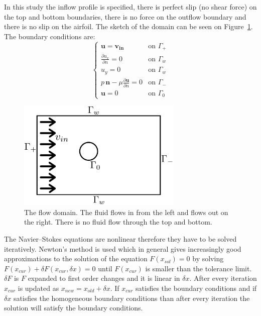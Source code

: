 \documentclass[12pt, a4paper]{article}
\begin{document}
    In this study the inflow profile is specified, there is perfect slip (no shear force) on the top and bottom boundaries, there is no force on the outflow boundary and there is no slip on the airfoil. The sketch of the domain can be seen on Figure~\ref{flow_domain}. The boundary conditions are:
    \begin{equation} \label{flow_boundary_conditions}
    \begin{cases}
    \mathbf{u} = \mathbf{v_{in}} & \text{on } \Gamma_+ \\
    \frac{\partial u_x}{\partial n} = 0 & \text{on } \Gamma_w \\
    u_y = 0  & \text{on } \Gamma_w \\
    p \, \mathbf{n} - \mu \frac{\partial \mathbf{u}}{\partial n} = 0 & \text{on } \Gamma_- \\
    \mathbf{u} = 0 & \text{on } \Gamma_0
    \end{cases}
    \end{equation}
    \begin{figure}[htbp]
        \centering
        \includegraphics[width=0.7\textwidth]{domain_vector_2}
        \caption{The flow domain. The fluid flows in from the left and flows out on the right. There is no fluid flow through the top and bottom.}
        \label{flow_domain}
    \end{figure}
    
    The Navier--Stokes equations are nonlinear therefore they have to be solved iteratively. Newton's method is used which in general gives increasingly good approximations to the solution of the equation $F(x_{sol}) = 0$ by solving $F(x_{cur}) + \delta F(x_{cur}, \delta x) = 0$ until  $F(x_{cur})$ is smaller than the tolerance limit. $\delta F$ is $F$ expanded to first order changes and it is linear in $\delta x$. After every iteration $x_{cur}$ is updated as $x_{new} = x_{old} + \delta x$. If $x_{cur}$ satisfies the boundary conditions and if $\delta x$ satisfies the homogeneous boundary conditions than after every iteration the solution will satisfy the boundary conditions.
    
\end{document}
